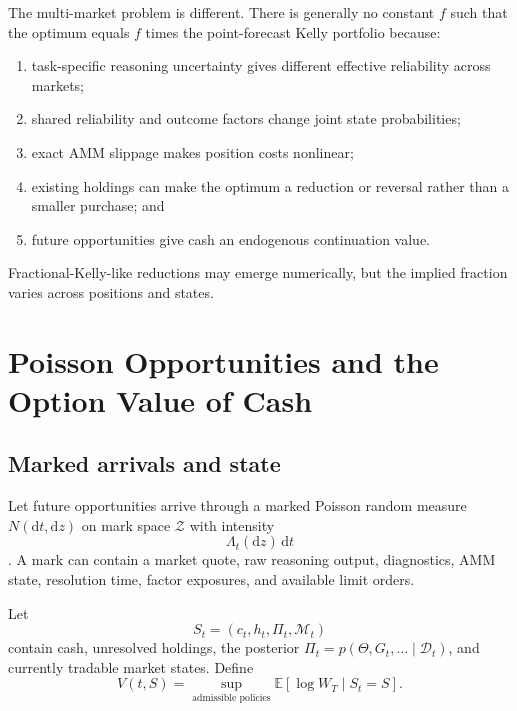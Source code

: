 \documentclass[journal,a4paper]{IEEEtran}
\newcommand{\E}{\mathbb{E}}
\begin{document}
The multi-market problem is different. There is generally no constant $f$ such that the optimum equals $f$ times the point-forecast Kelly portfolio because:
\begin{enumerate}
\item task-specific reasoning uncertainty gives different effective reliability across markets;
\item shared reliability and outcome factors change joint state probabilities;
\item exact AMM slippage makes position costs nonlinear;
\item existing holdings can make the optimum a reduction or reversal rather than a smaller purchase; and
\item future opportunities give cash an endogenous continuation value.
\end{enumerate}
Fractional-Kelly-like reductions may emerge numerically, but the implied fraction varies across positions and states.

\section{Poisson Opportunities and the Option Value of Cash}
\subsection{Marked arrivals and state}
Let future opportunities arrive through a marked Poisson random measure $N(\mathrm{d}t,\mathrm{d}z)$ on mark space $\mathcal{Z}$ with intensity
\begin{equation}
\Lambda_t(\mathrm{d}z)\,\mathrm{d}t
\end{equation}
\cite{daleyvere2003}. A mark can contain a market quote, raw reasoning output, diagnostics, AMM state, resolution time, factor exposures, and available limit orders.

Let
\begin{equation}
S_t=(c_t,h_t,\Pi_t,\mathcal{M}_t)
\end{equation}
contain cash, unresolved holdings, the posterior $\Pi_t=p(\Theta,G_t,\ldots\mid\mathcal{D}_t)$, and currently tradable market states. Define
\begin{equation}
V(t,S)
=
\sup_{\text{admissible policies}}
\E[\log W_T\mid S_t=S].
\label{eq:value-function}
\end{equation}
\end{document}
